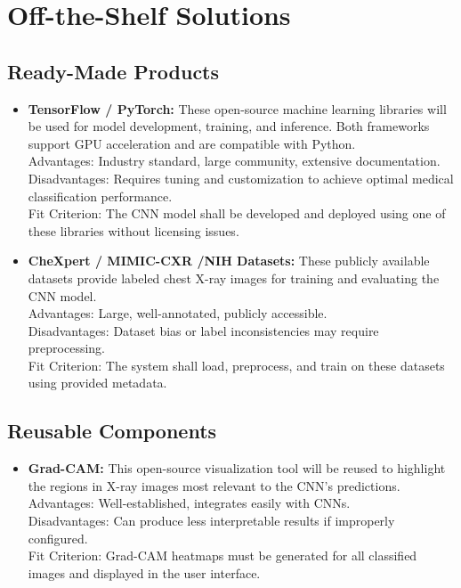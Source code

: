 \documentclass[12pt]{article}
\begin{document}
\section{Off-the-Shelf Solutions}


\subsection{Ready-Made Products}
\begin{itemize}
    \item \textbf{TensorFlow / PyTorch:} These open-source machine learning libraries will be used for model development, training, and inference. Both frameworks support GPU acceleration and are compatible with Python.\\
    Advantages: Industry standard, large community, extensive documentation.\\
    Disadvantages: Requires tuning and customization to achieve optimal medical classification performance.\\
    Fit Criterion: The CNN model shall be developed and deployed using one of these libraries without licensing issues.

    \item \textbf{CheXpert / MIMIC-CXR /NIH Datasets:} These publicly available datasets provide labeled chest X-ray images for training and evaluating the CNN model.\\
    Advantages: Large, well-annotated, publicly accessible.\\
    Disadvantages: Dataset bias or label inconsistencies may require preprocessing.\\
    Fit Criterion: The system shall load, preprocess, and train on these datasets using provided metadata.
\end{itemize}

\subsection{Reusable Components}
\begin{itemize}
    \item \textbf{Grad-CAM:} This open-source visualization tool will be reused to highlight the regions in X-ray images most relevant to the CNN's predictions.\\
    Advantages: Well-established, integrates easily with CNNs.\\
    Disadvantages: Can produce less interpretable results if improperly configured.\\
    Fit Criterion: Grad-CAM heatmaps must be generated for all classified images and displayed in the user interface.
\end{itemize}
\end{document}

